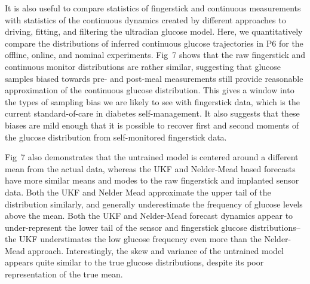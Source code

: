 \documentclass[10pt,letterpaper]{article}
\begin{document}
It is also useful to compare statistics of fingerstick and continuous measurements with statistics of the continuous dynamics created by different approaches to driving, fitting, and filtering the ultradian glucose model. 
Here, we quantitatively compare the distributions of inferred continuous glucose trajectories in P6 for the offline, online, and nominal experiments. Fig~7 shows that the raw fingerstick and continuous monitor distributions are rather similar, suggesting that glucose samples biased towards pre- and post-meal measurements still provide reasonable approximation of the continuous glucose distribution. This gives a window into the types of sampling bias we are likely to see with fingerstick data, which is the current standard-of-care in diabetes self-management. It also suggests that these biases are mild enough that it is possible to recover first and second moments of the glucose distribution from self-monitored fingerstick data. 

Fig~7 also demonstrates that the untrained model is centered around a different mean from the actual data, whereas the UKF and Nelder-Mead based forecasts have more similar means and modes to the raw fingerstick and implanted sensor data. Both the UKF and Nelder Mead approximate the upper tail of the distribution similarly, and generally underestimate the frequency of glucose levels above the mean. Both the UKF and Nelder-Mead forecast dynamics appear to under-represent the lower tail of the sensor and fingerstick glucose distributions--the UKF understimates the low glucose frequency even more than the Nelder-Mead approach. Interestingly, the skew and variance of the untrained model appears quite similar to the true glucose distributions, despite its poor representation of the true mean.



\end{document}
